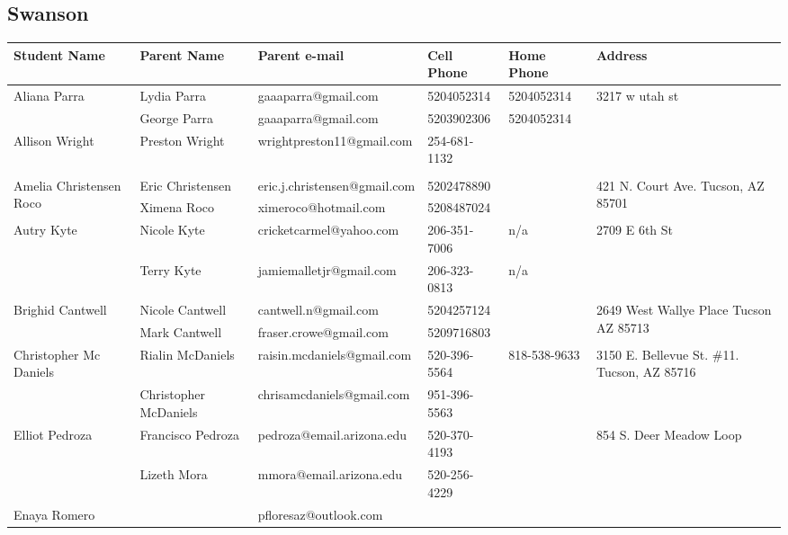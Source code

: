 \documentclass[landscape]{article}\usepackage[]{graphicx}\usepackage[]{color}
\begin{document}
\subsection{Swanson}
\begin{longtable}{|p{100pt}|p{100pt}|p{140pt}|p{60pt}|p{64pt}|p{120pt}|}
\textbf{Student Name} & \textbf{Parent Name} & \textbf{Parent e-mail} & \textbf{Cell Phone} & \textbf{Home Phone} & \textbf{Address}\\
\hline
\hline
\multirow{2}{100pt}{Aliana Parra} & Lydia Parra & gaaaparra@gmail.com & 5204052314 & 5204052314 & \multirow{2}{120pt}{3217 w utah st} \\
 & George Parra & gaaaparra@gmail.com & 5203902306 & 5204052314 & \\
\hline
\multirow{2}{100pt}{Allison Wright} & Preston Wright & wrightpreston11@gmail.com & 254-681-1132 &  & \multirow{2}{120pt}{} \\
 &  &  &  &  & \\
\hline
\multirow{2}{100pt}{Amelia Christensen Roco} & Eric Christensen & eric.j.christensen@gmail.com & 5202478890 &  & \multirow{2}{120pt}{421 N. Court Ave. Tucson, AZ 85701} \\
 & Ximena Roco & ximeroco@hotmail.com & 5208487024 &  & \\
\hline
\multirow{2}{100pt}{Autry Kyte} & Nicole Kyte & cricketcarmel@yahoo.com & 206-351-7006 & n/a & \multirow{2}{120pt}{2709 E 6th St} \\
 & Terry Kyte & jamiemalletjr@gmail.com & 206-323-0813 & n/a & \\
\hline
\multirow{2}{100pt}{Brighid Cantwell} & Nicole Cantwell & cantwell.n@gmail.com & 5204257124 &  & \multirow{2}{120pt}{2649 West Wallye Place Tucson AZ 85713} \\
 & Mark Cantwell & fraser.crowe@gmail.com & 5209716803 &  & \\
\hline
\multirow{2}{100pt}{Christopher Mc Daniels} & Rialin McDaniels & raisin.mcdaniels@gmail.com & 520-396-5564 & 818-538-9633 & \multirow{2}{120pt}{3150 E. Bellevue St. \#11. Tucson, AZ 85716} \\
 & Christopher McDaniels & chrisamcdaniels@gmail.com & 951-396-5563 &  & \\
\hline
\multirow{2}{100pt}{Elliot Pedroza} & Francisco Pedroza & pedroza@email.arizona.edu & 520-370-4193 &  & \multirow{2}{120pt}{854 S. Deer Meadow Loop} \\
 & Lizeth Mora & mmora@email.arizona.edu & 520-256-4229 &  & \\
\hline
\multirow{2}{100pt}{Enaya Romero} &  & pfloresaz@outlook.com &  &  & \multirow{2}{120pt}{} \\

\end{longtable}
\end{document}
